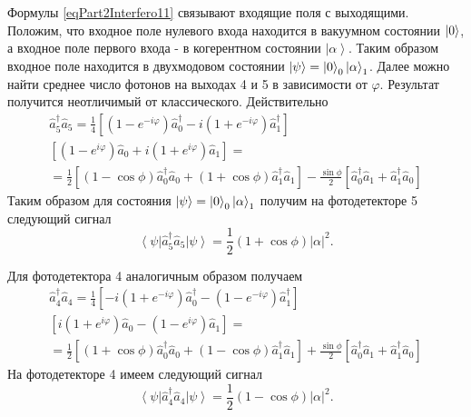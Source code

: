 Формулы \eqref{eqPart2Interfero11} связывают входящие поля с
выходящими. Положим, что входное поле нулевого входа находится в
вакуумном состоянии $\ket{0}$, а входное поле первого входа - в
когерентном состоянии $\left|\alpha\right>$. Таким образом входное
поле находится в двухмодовом состоянии $\left|\psi\right> =
\ket{0}_0\left|\alpha\right>_1$. Далее можно найти
среднее число фотонов на выходах 4 и 5 в зависимости от
$\varphi$. Результат получится неотличимый от классического.
Действительно
\begin{eqnarray}
  \hat{a}_5^{\dag}\hat{a}_5 =
  \frac{1}{4}
  \left[
    \left(1 - e^{-i \varphi}\right)\hat{a}_0^{\dag} -
    i \left(1 + e^{-i \varphi}\right)\hat{a}_1^{\dag}
    \right]
  \nonumber \\
  \left[
    \left(1 - e^{i \varphi}\right)\hat{a}_0 +
    i \left(1 + e^{i \varphi}\right)\hat{a}_1
    \right] = 
  \nonumber \\
  = \frac{1}{2}
  \left[
    \left(
    1 -  \cos \phi 
    \right)
    \hat{a}_0^{\dag}\hat{a}_0 +
    \left(
    1 +  \cos \phi 
    \right)
    \hat{a}_1^{\dag}\hat{a}_1
    \right] -
  \frac{\sin \phi}{2}
  \left[
    \hat{a}_0^{\dag}\hat{a}_1 +
    \hat{a}_1^{\dag}\hat{a}_0
    \right]
  \label{eqPart2InterferoA55}
\end{eqnarray}
Таким образом для состояния $\left|\psi\right> =
\ket{0}_0\left|\alpha\right>_1$ получим на фотодетекторе 5
следующий сигнал
\[
\left<\psi\right|\hat{a}^{\dag}_5 \hat{a}_5\left|\psi\right> =
\frac{1}{2}\left(1+\cos \phi \right) \left|\alpha\right|^2.
\]

Для фотодетектора 4 аналогичным образом получаем
\begin{eqnarray}
  \hat{a}_4^{\dag}\hat{a}_4 =
  \frac{1}{4}
  \left[
    - i \left(1 + e^{-i \varphi}\right)\hat{a}_0^{\dag} -
    \left(1 - e^{-i \varphi}\right)\hat{a}_1^{\dag}
    \right]
  \nonumber \\
  \left[
    i \left(1 + e^{i \varphi}\right)\hat{a}_0 -
    \left(1 - e^{i \varphi}\right)\hat{a}_1
    \right] = 
  \nonumber \\
  = \frac{1}{2}
  \left[
    \left(
    1 +  \cos \phi 
    \right)
    \hat{a}_0^{\dag}\hat{a}_0 +
    \left(
    1 -  \cos \phi 
    \right)
    \hat{a}_1^{\dag}\hat{a}_1
    \right] +
  \frac{\sin \phi}{2}
  \left[
    \hat{a}_0^{\dag}\hat{a}_1 +
    \hat{a}_1^{\dag}\hat{a}_0
    \right]
  \label{eqPart2InterferoA44}
\end{eqnarray}
На фотодетекторе 4 имеем
следующий сигнал
\[
\left<\psi\right|\hat{a}^{\dag}_4 \hat{a}_4\left|\psi\right> =
\frac{1}{2}\left(1-\cos \phi \right) \left|\alpha\right|^2.
\]

